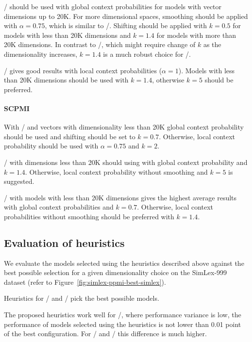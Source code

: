 \documentclass[11pt]{article}
\begin{document}


\logNSPMI/ should be used with global context probabilities for models with vector dimensions up to 20K. For more dimensional spaces, smoothing should be applied with $\alpha = 0.75$, which is similar to \SPMI/. Shifting should be applied with $k = 0.5$ for models with less than 20K dimensions and $k = 1.4$ for models with more than 20K dimensions. In contrast to \SPMI/, which might require change of $k$ as the dimensionality increases, $k = 1.4$ is a much robust choice for \logNSPMI/.

\NSPMI/ gives good results with local context probabilities ($\alpha = 1$). Models with less than 20K dimensions should be used with $k = 1.4$, otherwise $k = 5$ should be preferred.

\paragraph{SCPMI}

With \SCPMI/ and vectors with dimensionality less than 20K global context probability should be used and shifting should be set to $k = 0.7$. Otherwise, local context probability should be used with $\alpha = 0.75$ and $k = 2$.

\NSCPMI/ with dimensions less than 20K should using with global context probability and $k = 1.4$. Otherwise, local context probability without smoothing and $k = 5$ is suggested.

\logNSCPMI/ with models with less than 20K dimensions gives the highest average results with global context probabilities and $k = 0.7$. Otherwise, local context probabilities without smoothing should be preferred with $k = 1.4$.

\subsection{Evaluation of heuristics}
\label{sec:heuristic-evaluation}

We evaluate the models selected using the heuristics described above against the best possible selection for a given dimensionality choice on the SimLex-999 dataset (refer to Figure~\ref{fig:simlex-ppmi-best-simlex}).

Heuristics for \logNPMI/ and \logNCPMI/ pick the best possible models.

The proposed heuristics work well for \logNSPMI/, where performance variance is low, the performance of models selected using the heuristics is not lower than 0.01 point of the best configuration. For \SPMI/ and \NSPMI/ this difference is much higher.
\end{document}
